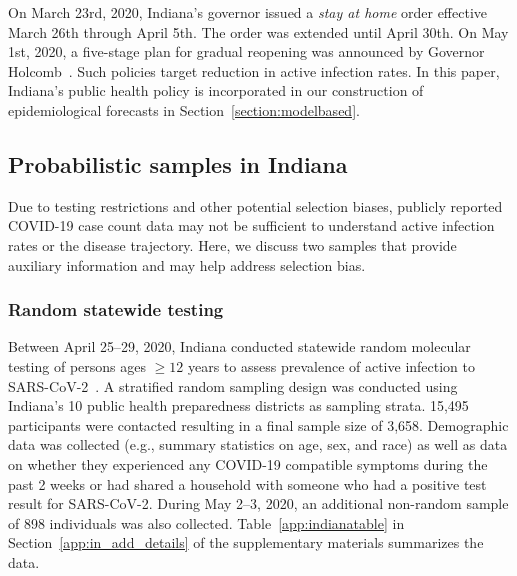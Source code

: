 \documentclass[11pt]{amsart}
\numberwithin{equation}{section}
\theoremstyle{plain}
\begin{document}
 On March 23rd, 2020, Indiana's governor issued a \emph{stay at home} order effective March 26th through April 5th.  The order was extended until April 30th. On May 1st, 2020, a five-stage plan for gradual reopening was announced by Governor Holcomb~\citep{fivestageplan}.  Such policies target reduction in active infection rates. In this paper, Indiana's public health policy is incorporated in our construction of epidemiological forecasts in Section~\ref{section:modelbased}.


 \subsection{Probabilistic samples in Indiana}

 Due to testing restrictions and other potential selection biases, publicly reported COVID-19 case count data may not be sufficient to understand active infection rates or the disease trajectory.  Here, we discuss two samples that provide auxiliary information and may help address selection bias.

 \subsubsection{Random statewide testing}

 Between April 25--29, 2020, Indiana conducted statewide random molecular testing of persons ages $\geq 12$ years to assess prevalence of active infection to SARS-CoV-2~\citep{Yiannoutsos2021}. A stratified random sampling design was conducted using Indiana’s 10 public health preparedness districts as sampling strata. 15,495 participants were contacted resulting in a final sample size of 3,658. Demographic data was collected (e.g., summary statistics on age, sex, and race) as well as data on whether they experienced any COVID-19 compatible symptoms during the past 2 weeks or had shared a household with someone who had a positive test result for SARS-CoV-2. During May 2--3, 2020, an additional non-random sample of 898 individuals was also collected.  Table~\ref{app:indianatable} in Section~\ref{app:in_add_details} of the supplementary materials summarizes the data.
\end{document}
